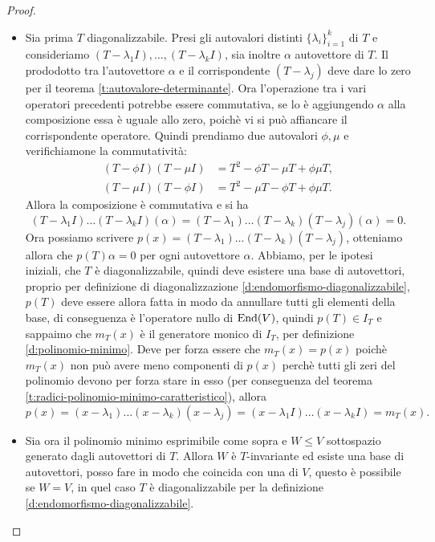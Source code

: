 \begin{proof}
	\begin{itemize}
		\item Sia prima $T$ diagonalizzabile.
			Presi gli autovalori distinti $\{\lambda_i\}_{i=1}^k$ di $T$ e consideriamo $(T-\lambda_1 I),\dots,(T-\lambda_k I)$, sia inoltre $\alpha$ autovettore di $T$.
			Il prododotto tra l'autovettore $\alpha$ e il corrispondente $(T-\lambda_j)$ deve dare lo zero per il teorema \ref{t:autovalore-determinante}.
			Ora l'operazione tra i vari operatori precedenti potrebbe essere commutativa, se lo è aggiungendo $\alpha$ alla composizione essa è uguale allo zero, poichè vi si può affiancare il corrispondente operatore.
			Quindi prendiamo due autovalori $\phi, \mu$ e verifichiamone la commutatività:
			\begin{align*}
				(T - \phi I)(T- \mu I) &= T^2 - \phi T - \mu T + \phi \mu T,\\
				(T- \mu I)(T - \phi I) &= T^2 - \mu T -\phi T + \phi \mu T.
			\end{align*}
			Allora la composizione è commutativa e si ha
			\begin{equation*}
				(T-\lambda_1 I)\dots(T-\lambda_k I)(\alpha) = (T-\lambda_1)\dots(T-\lambda_k)(T-\lambda_j)(\alpha) = 0.
			\end{equation*}
			Ora possiamo scrivere $p(x) = (T-\lambda_1)\dots(T-\lambda_k)(T-\lambda_j)$, otteniamo allora che $p(T)\alpha = 0$ per ogni autovettore $\alpha$.
			Abbiamo, per le ipotesi iniziali, che $T$ è diagonalizzabile, quindi deve esistere una base di autovettori, proprio per definizione di diagonalizzazione \ref{d:endomorfismo-diagonalizzabile}, $p(T)$  deve essere allora fatta in modo da annullare tutti gli elementi della base, di conseguenza è l'operatore nullo di $\operatorname{End}(V)$, quindi $p(T)\in I_T$ e sappaimo che $m_T(x)$ è il generatore monico di $I_T$, per definizione \ref{d:polinomio-minimo}.
			Deve per forza essere che $m_T(x)=p(x)$ poichè $m_T(x)$ non può avere meno componenti di $p(x)$ perchè tutti gli zeri del polinomio devono per forza stare in esso (per conseguenza del teorema \ref{t:radici-polinomio-minimo-caratteristico}), allora
			\begin{equation*}
				p(x) = (x-\lambda_1)\dots(x-\lambda_k)(x-\lambda_j) = (x-\lambda_1 I)\dots(x-\lambda_k I) = m_T(x).
			\end{equation*}
		\item Sia ora il polinomio minimo esprimibile come sopra e $W \leq V$ sottospazio generato dagli autovettori di $T$.
			Allora $W$ è $T$-invariante ed esiste una base di autovettori, posso fare in modo che coincida con una di $V$, questo è possibile se $W=V$, in quel caso $T$ è diagonalizzabile per la definizione \ref{d:endomorfismo-diagonalizzabile}.

\end{itemize}
\end{proof}
